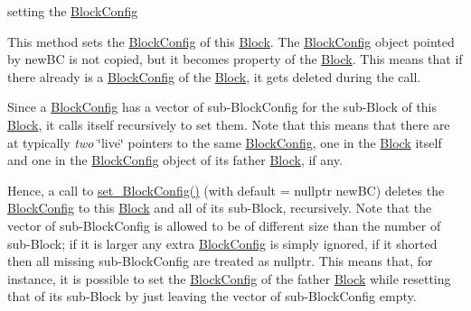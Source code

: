 setting the \mbox{\hyperlink{class_s_m_spp__di__unipi__it_1_1_block_config}{Block\+Config}} 

This method sets the \mbox{\hyperlink{class_s_m_spp__di__unipi__it_1_1_block_config}{Block\+Config}} of this \mbox{\hyperlink{class_s_m_spp__di__unipi__it_1_1_block}{Block}}. The \mbox{\hyperlink{class_s_m_spp__di__unipi__it_1_1_block_config}{Block\+Config}} object pointed by new\+BC is not copied, but it becomes property of the \mbox{\hyperlink{class_s_m_spp__di__unipi__it_1_1_block}{Block}}. This means that if there already is a \mbox{\hyperlink{class_s_m_spp__di__unipi__it_1_1_block_config}{Block\+Config}} of the \mbox{\hyperlink{class_s_m_spp__di__unipi__it_1_1_block}{Block}}, it gets deleted during the call.

Since a \mbox{\hyperlink{class_s_m_spp__di__unipi__it_1_1_block_config}{Block\+Config}} has a vector of sub-\/\+Block\+Config for the sub-\/\+Block of this \mbox{\hyperlink{class_s_m_spp__di__unipi__it_1_1_block}{Block}}, it calls itself recursively to set them. Note that this means that there are at typically {\itshape two} \char`\"{}live\char`\"{} pointers to the same \mbox{\hyperlink{class_s_m_spp__di__unipi__it_1_1_block_config}{Block\+Config}}, one in the \mbox{\hyperlink{class_s_m_spp__di__unipi__it_1_1_block}{Block}} itself and one in the \mbox{\hyperlink{class_s_m_spp__di__unipi__it_1_1_block_config}{Block\+Config}} object of its father \mbox{\hyperlink{class_s_m_spp__di__unipi__it_1_1_block}{Block}}, if any.

Hence, a call to \mbox{\hyperlink{class_s_m_spp__di__unipi__it_1_1_block_a18d411b740a47db00d15083c5c7ef2ba}{set\+\_\+\+Block\+Config()}} (with default = nullptr new\+BC) deletes the \mbox{\hyperlink{class_s_m_spp__di__unipi__it_1_1_block_config}{Block\+Config}} to this \mbox{\hyperlink{class_s_m_spp__di__unipi__it_1_1_block}{Block}} and all of its sub-\/\+Block, recursively. Note that the vector of sub-\/\+Block\+Config is allowed to be of different size than the number of sub-\/\+Block; if it is larger any extra \mbox{\hyperlink{class_s_m_spp__di__unipi__it_1_1_block_config}{Block\+Config}} is simply ignored, if it shorted then all missing sub-\/\+Block\+Config are treated as nullptr. This means that, for instance, it is possible to set the \mbox{\hyperlink{class_s_m_spp__di__unipi__it_1_1_block_config}{Block\+Config}} of the father \mbox{\hyperlink{class_s_m_spp__di__unipi__it_1_1_block}{Block}} while resetting that of its sub-\/\+Block by just leaving the vector of sub-\/\+Block\+Config empty.

